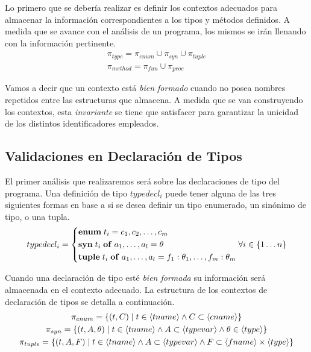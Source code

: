 \documentclass{article}
\begin{document}

Lo primero que se debería realizar es definir los contextos adecuados para almacenar la información correspondientes a los tipos y métodos definidos.
A medida que se avance con el análisis de un programa, los mismos se irán llenando con la información pertinente.
\begin{gather*}
\pi_{type} = \pi_{enum} \cup \pi_{syn} \cup \pi_{tuple}
\\
\pi_{method} = \pi_{fun} \cup \pi_{proc}
\end{gather*}

Vamos a decir que un contexto está \textit{bien formado} cuando no posea nombres repetidos entre las estructuras que almacena.
A medida que se van construyendo los contextos, esta \textit{invariante} se tiene que satisfacer para garantizar la unicidad de los distintos identificadores empleados.

\subsection{Validaciones en Declaración de Tipos}

El primer análisis que realizaremos será sobre las declaraciones de tipo del programa.
Una definición de tipo \textit{$typedecl_i$} puede tener alguna de las tres siguientes formas en base a si se desea definir un tipo enumerado, un sinónimo de tipo, o una tupla.
\begin{gather*}
typedecl_i =
\begin{cases*}
\T{enum} \; t_i = c_1, c_2, \ldots, c_m
\\
\T{syn} \; t_i \; \T{of} \; a_1, \ldots, a_l = \theta
\\
\T{tuple} \; t_i \; \T{of} \; a_1, \ldots, a_l = f_1 : \theta_1, \ldots, f_m : \theta_m
\end{cases*}
\forall i \in \{ 1 \ldots n \}
\end{gather*}

Cuando una declaración de tipo esté \textit{bien formada} su información será almacenada en el contexto adecuado.
La estructura de los contextos de declaración de tipos se detalla a continuación.
\begin{gather*}
\pi_{enum} =
\{ 
(t, C) \mid 
t \in \langle tname \rangle 
\wedge 
C \subset \langle cname \rangle
\}
\\
\pi_{syn} =
\{
(t, A, \theta) \mid 
t \in \langle tname \rangle
\wedge
A \subset \langle typevar \rangle
\wedge
\theta \in \langle type \rangle
\}
\\
\pi_{tuple} =
\{
(t, A, F) \mid
t \in \langle tname \rangle 
\wedge
A \subset \langle typevar \rangle
\wedge
F \subset \langle fname \rangle \times \langle type \rangle
\}
\end{gather*}
\end{document}
